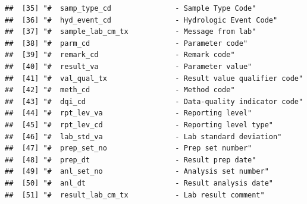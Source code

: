 \documentclass[
]{book}
\begin{document}
\begin{verbatim}
##  [35] "#  samp_type_cd               - Sample Type Code"                                                                                             
##  [36] "#  hyd_event_cd               - Hydrologic Event Code"                                                                                        
##  [37] "#  sample_lab_cm_tx           - Message from lab"                                                                                             
##  [38] "#  parm_cd                    - Parameter code"                                                                                               
##  [39] "#  remark_cd                  - Remark code"                                                                                                  
##  [40] "#  result_va                  - Parameter value"                                                                                              
##  [41] "#  val_qual_tx                - Result value qualifier code"                                                                                  
##  [42] "#  meth_cd                    - Method code"                                                                                                  
##  [43] "#  dqi_cd                     - Data-quality indicator code"                                                                                  
##  [44] "#  rpt_lev_va                 - Reporting level"                                                                                              
##  [45] "#  rpt_lev_cd                 - Reporting level type"                                                                                         
##  [46] "#  lab_std_va                 - Lab standard deviation"                                                                                       
##  [47] "#  prep_set_no                - Prep set number"                                                                                              
##  [48] "#  prep_dt                    - Result prep date"                                                                                             
##  [49] "#  anl_set_no                 - Analysis set number"                                                                                          
##  [50] "#  anl_dt                     - Result analysis date"                                                                                         
##  [51] "#  result_lab_cm_tx           - Lab result comment"                                                                                           

\end{verbatim}
\end{document}
